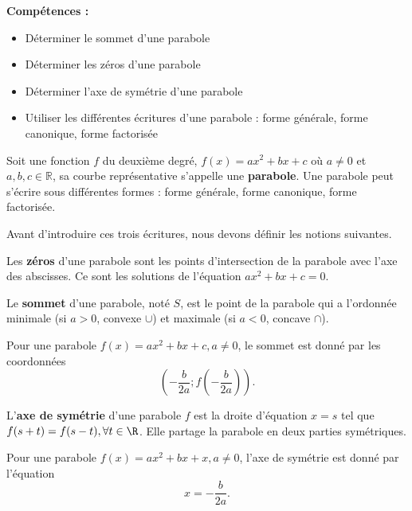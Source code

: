 \documentclass[a4paper,12pt]{report}
\begin{document}
{\bfseries Compétences :}
\begin{itemize}
	\item Déterminer le sommet d'une parabole
	\item Déterminer les zéros d'une parabole
	\item Déterminer l'axe de symétrie d'une parabole
	\item Utiliser les différentes écritures d'une parabole : forme générale, forme canonique, forme factorisée
\end{itemize}

\begin{defi}[parabole]
	Soit une fonction $f$ du deuxième degré, $f(x)=ax^2+bx+c$ où $a\neq 0$ et $a,b,c\in \mathbb{R}$, sa courbe représentative s'appelle une {\bfseries parabole}. Une parabole peut s'écrire sous différentes formes : forme générale, forme canonique, forme factorisée.
\end{defi}

Avant d'introduire ces trois écritures, nous devons définir les notions suivantes. 

\begin{defi}[zéros]
	Les {\bfseries zéros} d'une parabole sont les points d'intersection de la parabole avec l'axe des abscisses. Ce sont les solutions de l'équation $ax^2+bx+c=0$.
\end{defi}

\begin{defi}[sommet]
	Le {\bfseries sommet} d'une parabole, noté $S$, est le point de la parabole qui a l'ordonnée minimale (si $a>0$, convexe $\cup$) et maximale (si $a<0$, concave $\cap$). 
\end{defi}
   
\begin{rem}
Pour une parabole $f(x)=ax^2+bx+c, a\neq 0$, le sommet est donné par les coordonnées 
\[\left(-\dfrac{b}{2a};f\left(-\dfrac{b}{2a}\right)\right).\]
\end{rem}

    \begin{defi}
	    L'{\bfseries axe de symétrie} d'une parabole $f$ est la droite d'équation $x=s$ tel que $f(s+t)=f(s-t), \forall t\in \R$. Elle partage la parabole en deux parties symétriques. 
    \end{defi}
    \begin{rem}
	    Pour une parabole $f(x)=ax^2+bx+x, a\neq 0$, l'axe de symétrie est donné par l'équation \[x=-\dfrac{b}{2a}.\]
    \end{rem}
    
\end{document}
